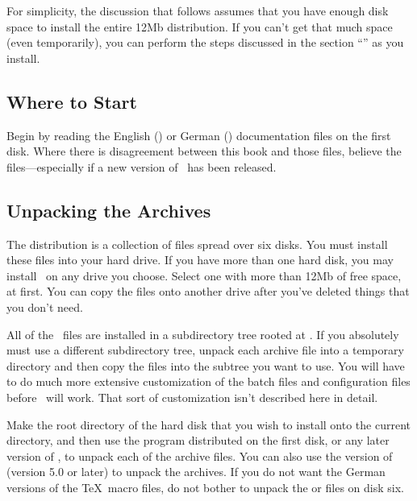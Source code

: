 For simplicity, the discussion that follows assumes that you have enough
disk space to install the entire 12Mb distribution.  If you can't get that
much space (even temporarily), you can perform the steps discussed in the
section ``'' as you install.

\subsection{Where to Start}

Begin by reading the English () or German ()
documentation files on the first disk.  Where there is disagreement
between this book and those files, believe the files---especially
if a new version of \emTeX\ has been released.

\subsection{Unpacking the Archives}

The \emTeX{} distribution 
is a collection of  files spread over
six disks.  You must install these files into your hard drive.  If you have
more than one hard disk, you may install \emTeX\ on any drive you choose.
Select one with more than 12Mb
of free space, at first.  You can copy the
files onto another drive after you've deleted things that you don't need.

All of the \emTeX\ files are installed in a subdirectory tree rooted
at .  If you absolutely must use a different
subdirectory tree, unpack each archive file into a temporary directory
and then copy the files into the subtree you want to use.  You will have
to do much more extensive customization of the batch files and
configuration files before \emTeX\ will work.  That sort of 
customization isn't described here in detail.

Make the root directory of the hard disk that you wish to install onto
the current directory, and then use the  %
program
distributed on the first disk, or any later version of
, to unpack each of the archive files.  You can also
use the  version of  (version 5.0 or
later) to unpack the archives.  
If you do not want the German versions of the \TeX\ macro files, do
not bother to unpack the  or 
files on disk six.

